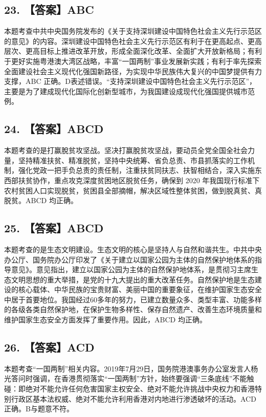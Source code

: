 \documentclass[UTF8,11pt]{ctexart}
\begin{document}
\subsection*{23. 【答案】ABC}

本题考查中共中央国务院发布的《关于支持深圳建设中国特色社会主义先行示范区的意见》的内容。深圳建设中国特色社会主义先行示范区有利于在更高起点、更高层次、更高目标上推进改革开放，形成全面深化改革、全面扩大开放新格局；有利于更好实施粤港澳大湾区战略，丰富“一国两制”事业发展新实践；有利于率先探索全面建设社会主义现代化强国新路径，为实现中华民族伟大复兴的中国梦提供有力支撑，ABC 正确。D表述错误。“支持深圳建设中国特色社会主义先行示范区”，主要是为了建成现代化国际化创新型城市，为我国建设成现代化强国提供城市范例。


\subsection*{24. 【答案】ABCD}

本题考查的是打赢脫贫攻坚战。坚决打赢脫贫攻坚战，要动员全党全国全社会力量，坚持精准扶贫、精准脱贫，坚持中央统筹、省负总责、市县抓落实的工作机制，强化党政一把手负总责的责任制，注重扶贫同扶志、扶智相结合，深入实施东西部扶贫协作，重点攻克深度贫困地区脱贫任务，确保到 2020 年我国现行标准下农村贫困人口实现脱贫，贫困县全部摘帽，解决区域性整体贫困，做到脱真贫、真脱贫。ABCD 均正确。


\subsection*{25. 【答案】ABCD}

本题考查的是生态文明建设。生态文明的核心是坚持人与自然和谐共生。中共中央办公厅、国务院办公厅印发了《关于建立以国家公园为主体的自然保护地体系的指导意见》。意见指出，建立以国家公园为主体的自然保护地体系，是贯彻习主席生态文明思想的重大举措，是党的十九大提出的重大改革任务。自然保护地是生态建设的核心载体、中华民族的宝贵财富、美丽中国的重要象征，在维护国家生态安全中居于首要地位。我国经过60多年的努力，已建立数量众多、类型丰富、功能多样的各级各类自然保护地，在保护生物多样性、保存自然遗产、改善生态环境质量和维护国家生态安全方面发挥了重要作用。因此，ABCD 均正确。


\subsection*{26. 【答案】ACD}

本题考查“一国两制”相关内容。2019年7月29日，国务院港澳事务办公室发言人杨光答问时强调，在香港贯彻落实“一国两制”方针，始终要强调“三条底线”不能触碰：即绝对不能允许任何危害国家主权安全、绝对不能允许挑战中央权力和香港特别行政区基本法权威、绝对不能允许利用香港对内地进行渗透破坏的活动。ACD正确。B与题意不符。
\end{document}
